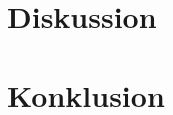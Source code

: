 \documentclass{article}
\begin{document}

\tableofcontents
\newpage



\newpage

\newpage

\newpage


\newpage

\newpage


\section{Diskussion}
\section{Konklusion}
\newpage
\printbibliography

\newpage

\end{document}
